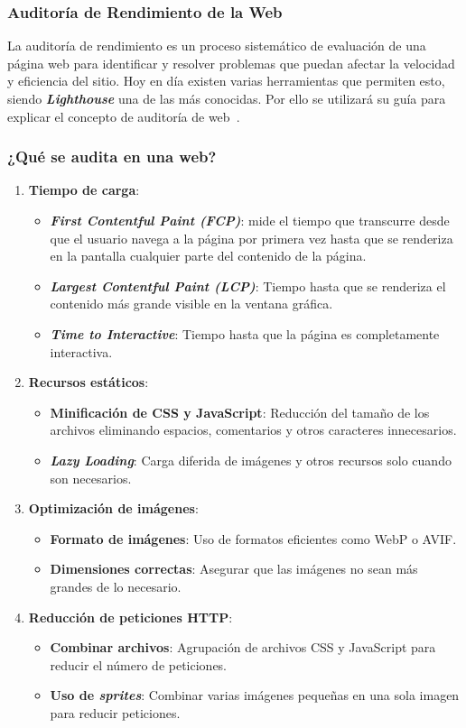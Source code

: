 \subsubsection{Auditoría de Rendimiento de la Web}
La auditoría de rendimiento es un proceso sistemático de evaluación de una página web para identificar y resolver problemas que puedan afectar la velocidad y eficiencia del sitio. Hoy en día existen varias herramientas que permiten esto, siendo \textit{\textbf{Lighthouse}} una de las más conocidas. Por ello se utilizará su guía para explicar el concepto de auditoría de web~\cite{web:lighthouse}. 
\subsubsection{¿Qué se audita en una web?}
\begin{enumerate}
	\item \textbf{Tiempo de carga}:
	\begin{itemize}
		\item \textbf{\textit{First Contentful Paint (FCP)}}: mide el tiempo que transcurre desde que el usuario navega a la página por primera vez hasta que se renderiza en la pantalla cualquier parte del contenido de la página.
		\item \textbf{\textit{Largest Contentful Paint (LCP)}}: Tiempo hasta que se renderiza el contenido más grande visible en la ventana gráfica.
		\item \textbf{\textit{Time to Interactive}}: Tiempo hasta que la página es completamente interactiva.
	\end{itemize}
	\item \textbf{Recursos estáticos}: 
	\begin{itemize}
		\item \textbf{Minificación de CSS y JavaScript}: Reducción del tamaño de los archivos eliminando espacios, comentarios y otros caracteres innecesarios.
		\item \textbf{\textit{Lazy Loading}}: Carga diferida de imágenes y otros recursos solo cuando son necesarios.
	\end{itemize}
	\item \textbf{Optimización de imágenes}:
	\begin{itemize}
		\item \textbf{Formato de imágenes}: Uso de formatos eficientes como WebP o AVIF.
		\item \textbf{Dimensiones correctas}: Asegurar que las imágenes no sean más grandes de lo necesario.
	\end{itemize}
	\item \textbf{Reducción de peticiones HTTP}: 
	\begin{itemize}
		\item \textbf{Combinar archivos}: Agrupación de archivos CSS y JavaScript para reducir el número de peticiones.
		\item \textbf{Uso de \textit{sprites}}: Combinar varias imágenes pequeñas en una sola imagen para reducir peticiones.  
	\end{itemize}
\end{enumerate}

